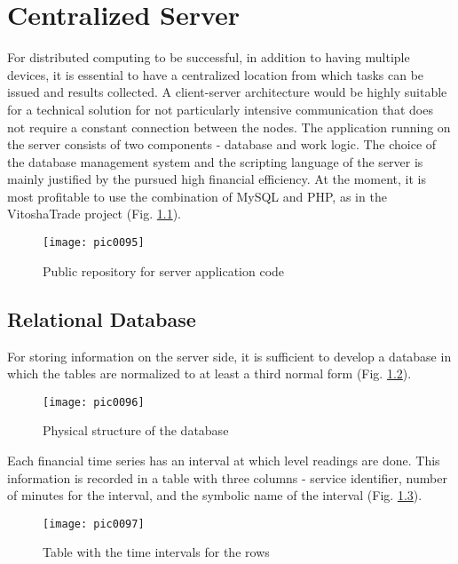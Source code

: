 \newpage
\chapter{Centralized Server}
\label{chapter05}

For distributed computing to be successful, in addition to having multiple devices, it is essential to have a centralized location from which tasks can be issued and results collected. A client-server architecture would be highly suitable for a technical solution for not particularly intensive communication that does not require a constant connection between the nodes. The application running on the server consists of two components - database and work logic. The choice of the database management system and the scripting language of the server is mainly justified by the pursued high financial efficiency. At the moment, it is most profitable to use the combination of MySQL and PHP, as in the VitoshaTrade\cite{vtrade} project (Fig. \ref{fig:pic0095}).

\begin{figure}[h]
\centering
\texttt{[image: pic0095]}
\caption{Public repository for server application code}
\label{fig:pic0095}
\end{figure}
\FloatBarrier

\section{Relational Database}

For storing information on the server side, it is sufficient to develop a database in which the tables are normalized to at least a third normal form (Fig. \ref{fig:pic0096}).

\begin{figure}[h]
\centering
\texttt{[image: pic0096]}
\caption{Physical structure of the database}
\label{fig:pic0096}
\end{figure}
\FloatBarrier

Each financial time series has an interval at which level readings are done. This information is recorded in a table with three columns - service identifier, number of minutes for the interval, and the symbolic name of the interval (Fig. \ref{fig:pic0097}).

\begin{figure}[h]
\centering
\texttt{[image: pic0097]}
\caption{Table with the time intervals for the rows}
\label{fig:pic0097}
\end{figure}
\FloatBarrier

